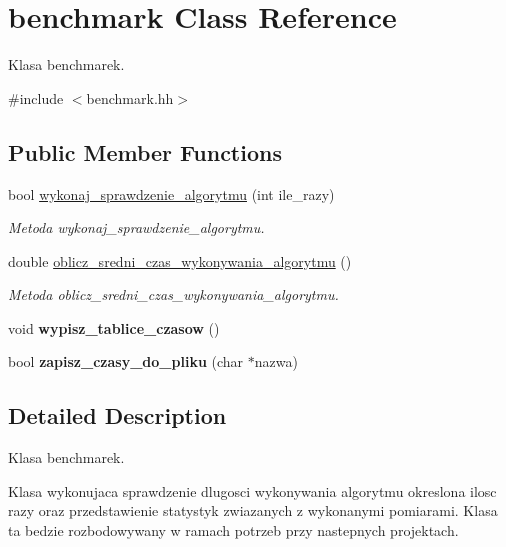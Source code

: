 \hypertarget{classbenchmark}{\section{benchmark Class Reference}
\label{classbenchmark}
}


Klasa benchmarek.  




{\ttfamily \#include $<$benchmark.\-hh$>$}

\subsection*{Public Member Functions}
\begin{DoxyCompactItemize}
\item 
bool \hyperlink{classbenchmark_ab83ffeb122d3cc231acdbf45db4f5ff8}{wykonaj\-\_\-sprawdzenie\-\_\-algorytmu} (int ile\-\_\-razy)
\begin{DoxyCompactList}\small\item\em Metoda wykonaj\-\_\-sprawdzenie\-\_\-algorytmu. \end{DoxyCompactList}\item 
double \hyperlink{classbenchmark_a47af0a6ddc3d1e5afe3324f166ae1292}{oblicz\-\_\-sredni\-\_\-czas\-\_\-wykonywania\-\_\-algorytmu} ()
\begin{DoxyCompactList}\small\item\em Metoda oblicz\-\_\-sredni\-\_\-czas\-\_\-wykonywania\-\_\-algorytmu. \end{DoxyCompactList}\item 
\hypertarget{classbenchmark_ad2fa742abac2df08a8a3174ca0cd2a09}{void {\bfseries wypisz\-\_\-tablice\-\_\-czasow} ()}\label{classbenchmark_ad2fa742abac2df08a8a3174ca0cd2a09}

\item 
\hypertarget{classbenchmark_a452c061a57050dacd3429ad5186b49fe}{bool {\bfseries zapisz\-\_\-czasy\-\_\-do\-\_\-pliku} (char $\ast$nazwa)}\label{classbenchmark_a452c061a57050dacd3429ad5186b49fe}

\end{DoxyCompactItemize}


\subsection{Detailed Description}
Klasa benchmarek. 

Klasa wykonujaca sprawdzenie dlugosci wykonywania algorytmu okreslona ilosc razy oraz przedstawienie statystyk zwiazanych z wykonanymi pomiarami. Klasa ta bedzie rozbodowywany w ramach potrzeb przy nastepnych projektach. 

